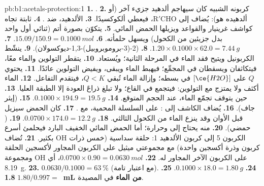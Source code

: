 \begin{solution}{pb:b1:acetals-protection:1}
\textbf{1.} .
\textbf{2.} كربونه الشبيه  كان سيهاجم ألدهيد جزيء
آخر (أو ألدهيده هو): يُضاف  إلى $\mathrm{R'CHO}$، فيعطي ألكوكسيدًا.
\textbf{3.} الألدهيد، ضد .
\textbf{4.}  ثابتة تجاه كواشف غرينيار والقواعد
ويزيلها الحمض المائي.
\textbf{5.} يتكوّن بصورة أتم (ثنائي أول واحد بدل جزيئين من الكحول)
ويسهل حلمأته.
\textbf{6.} $15.09/150.9 = \qty{0.1000}{mol}$.
\textbf{7.} $1.20 \times 0.1000 \times 62.0 = \qty{7.44}{g}$.
\textbf{8.} 
(2-(3-بروموبروبيل)-1,3-ديوكسولان).
\textbf{9.} ينشّط الكربونيل ويتيح فقد الماء في
المرحلة الثانية؛ ويُستعاد.
\textbf{10.} يتقطر التولوين والماء معًا، فيتكاثفان ويسقطان في
المجمِّع؛ فيهبط الماء ويبقى، ويفيض التولوين عائدًا.
\textbf{11.} يحتوي $Q$ على $[\ce{H2O}]$ في بسطه؛ وإزالة الماء تُبقي
$Q < K$، فيتقدم التفاعل.
\textbf{12.} الماء أكثف ولا يمتزج مع التولوين: فيتجمع في
القاع؛ ولا تبلغ ذراعَ العودة إلا الطبقة العليا.
\textbf{13.} حين يتوقف تجمّع الماء، عند الحجم المتوقع.
\textbf{14.} $0.1000 \times 194.9 = \qty{19.5}{g}$.
\textbf{15.}  (إيثر جاف).
\textbf{16.} يُضاف الكاشف إلى : 
 على السلسلة المحمية، مع .
\textbf{17.} كان الحمض سيزيل  قبل الأوان وقد
ينزع الماء من الكحول الثالثي.
\textbf{18.} $0.0700 \times 174.0 = \qty{12.2}{g}$.
\textbf{19.} 
( حمضي).
\textbf{20.}  منه يحتاج إلى  وحرارة؛ أما الحمض المائي
الخفيف البارد فيحلمئ  أسرع بكثير.
\textbf{21.} تُضاف OH الكربون 5 إلى كربون الألدهيد 1: حلقة سداسية
(خمس ذرات كربون وذرة أكسجين واحدة) مع مجموعتي ميثيل على الكربون
المجاور لأكسجين الحلقة ومجموعة OH على الكربون الآخر المجاور له.
\textbf{22.} $0.0700 \times 0.90 = \qty{0.0630}{mol}$، أي \qty{8.19}{g}.
\textbf{23.} $0.0630/0.1000 = \qty{63}{\percent}$ (مع اعتبار 
تامة).
\textbf{24.} $0.1000 \times 18.0 = \qty{1.80}{g}$.
\textbf{25.} $1.80/0.997 =$ \textbf{\qty{1.8}{mL} من الماء} في المصيدة.
\end{solution}
